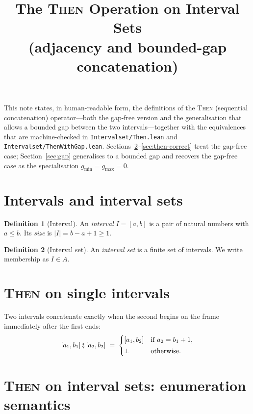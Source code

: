 \documentclass[11pt]{article}
\title{The \textsc{Then} Operation on Interval Sets\\
       \large (adjacency and bounded-gap concatenation)}
\author{}
\date{}
\newcommand{\Then}{\mathbin{\fatsemi}}              %
\newcommand{\Empty}{\bot}                           %
\newcommand{\size}[1]{\lvert #1 \rvert}
\newcommand{\gmin}{g_{\min}}
\newcommand{\gmax}{g_{\max}}
\theoremstyle{definition}
\newtheorem{definition}{Definition}
\theoremstyle{plain}
\begin{document}
\maketitle

\noindent
This note states, in human-readable form, the definitions of the \textsc{Then}
(sequential concatenation) operator---both the gap-free version and the
generalisation that allows a bounded gap between the two intervals---together
with the equivalences that are machine-checked in
\texttt{Intervalset/Then.lean} and \texttt{Intervalset/ThenWithGap.lean}.
Sections~\ref{sec:then-single}--\ref{sec:then-correct} treat the gap-free case;
Section~\ref{sec:gap} generalises to a bounded gap and recovers the gap-free
case as the specialisation $\gmin = \gmax = 0$.

\section{Intervals and interval sets}

\begin{definition}[Interval]
An \emph{interval} $I = [a, b]$ is a pair of natural numbers with $a \le b$.
Its \emph{size} is $\size{I} = b - a + 1 \ge 1$.
\end{definition}

\begin{definition}[Interval set]
An \emph{interval set} is a finite set of intervals. We write membership as
$I \in A$.
\end{definition}

\section{\textsc{Then} on single intervals}
\label{sec:then-single}

Two intervals concatenate exactly when the second begins on the frame
immediately after the first ends:
\[
  [a_1, b_1] \Then [a_2, b_2] \;=\;
  \begin{cases}
    [a_1, b_2] & \text{if } a_2 = b_1 + 1,\\[2pt]
    \Empty     & \text{otherwise.}
  \end{cases}
\]

\section{\textsc{Then} on interval sets: enumeration semantics}
\end{document}
